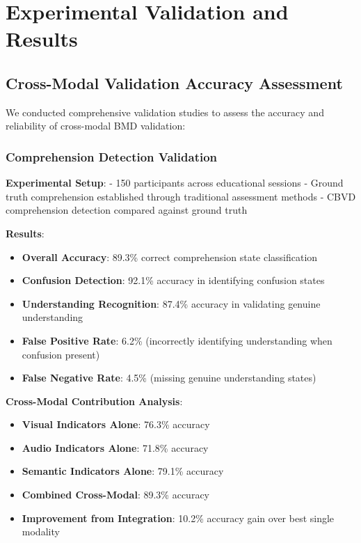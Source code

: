 \documentclass[12pt,a4paper]{article}
\begin{document}
\section{Experimental Validation and Results}

\subsection{Cross-Modal Validation Accuracy Assessment}

We conducted comprehensive validation studies to assess the accuracy and reliability of cross-modal BMD validation:

\subsubsection{Comprehension Detection Validation}

\textbf{Experimental Setup}:
- 150 participants across educational sessions
- Ground truth comprehension established through traditional assessment methods
- CBVD comprehension detection compared against ground truth

\textbf{Results}:
\begin{itemize}
\item \textbf{Overall Accuracy}: 89.3\% correct comprehension state classification
\item \textbf{Confusion Detection}: 92.1\% accuracy in identifying confusion states
\item \textbf{Understanding Recognition}: 87.4\% accuracy in validating genuine understanding
\item \textbf{False Positive Rate}: 6.2\% (incorrectly identifying understanding when confusion present)
\item \textbf{False Negative Rate}: 4.5\% (missing genuine understanding states)
\end{itemize}

\textbf{Cross-Modal Contribution Analysis}:
\begin{itemize}
\item \textbf{Visual Indicators Alone}: 76.3\% accuracy
\item \textbf{Audio Indicators Alone}: 71.8\% accuracy  
\item \textbf{Semantic Indicators Alone}: 79.1\% accuracy
\item \textbf{Combined Cross-Modal}: 89.3\% accuracy
\item \textbf{Improvement from Integration}: 10.2\% accuracy gain over best single modality
\end{itemize}
\end{document}
